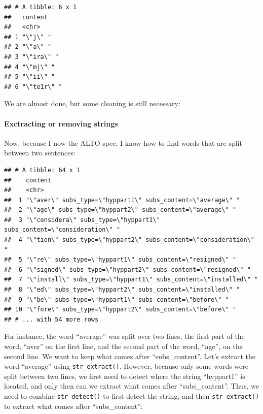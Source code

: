 \documentclass[]{gitbook}
\newenvironment{Shaded}{\begin{snugshade}}{\end{snugshade}}
\newcommand{\KeywordTok}[1]{\textcolor[rgb]{0.13,0.29,0.53}{\textbf{#1}}}
\newcommand{\NormalTok}[1]{#1}
\newcommand{\OperatorTok}[1]{\textcolor[rgb]{0.81,0.36,0.00}{\textbf{#1}}}
\newcommand{\StringTok}[1]{\textcolor[rgb]{0.31,0.60,0.02}{#1}}
\let\oldparagraph\paragraph
\renewcommand{\paragraph}[1]{\oldparagraph{#1}\mbox{}}
\begin{document}
\begin{verbatim}
## # A tibble: 6 x 1
##   content    
##   <chr>      
## 1 "\"j\" "   
## 2 "\"a\" "   
## 3 "\"ira\" " 
## 4 "\"mj\" "  
## 5 "\"ii\" "  
## 6 "\"te1r\" "
\end{verbatim}

We are almost done, but some cleaning is still necessary:

\hypertarget{exctracting-or-removing-strings}{%
\paragraph{Exctracting or removing strings}\label{exctracting-or-removing-strings}}

Now, because I now the ALTO spec, I know how to find words that are split between two sentences:

\begin{Shaded}
\end{Shaded}

\begin{verbatim}
## # A tibble: 64 x 1
##    content                                                               
##    <chr>                                                                 
##  1 "\"aver\" subs_type=\"hyppart1\" subs_content=\"average\" "           
##  2 "\"age\" subs_type=\"hyppart2\" subs_content=\"average\" "            
##  3 "\"considera\" subs_type=\"hyppart1\" subs_content=\"consideration\" "
##  4 "\"tion\" subs_type=\"hyppart2\" subs_content=\"consideration\" "     
##  5 "\"re\" subs_type=\"hyppart1\" subs_content=\"resigned\" "            
##  6 "\"signed\" subs_type=\"hyppart2\" subs_content=\"resigned\" "        
##  7 "\"install\" subs_type=\"hyppart1\" subs_content=\"installed\" "      
##  8 "\"ed\" subs_type=\"hyppart2\" subs_content=\"installed\" "           
##  9 "\"be\" subs_type=\"hyppart1\" subs_content=\"before\" "              
## 10 "\"fore\" subs_type=\"hyppart2\" subs_content=\"before\" "            
## # ... with 54 more rows
\end{verbatim}

For instance, the word ``average'' was split over two lines, the first part of the word, ``aver'' on the
first line, and the second part of the word, ``age'', on the second line. We want to keep what comes
after ``subs\_content''. Let's extract the word ``average'' using \texttt{str\_extract()}. However, because only
some words were split between two lines, we first need to detect where the string ``hyppart1'' is
located, and only then can we extract what comes after ``subs\_content''. Thus, we need to combine
\texttt{str\_detect()} to first detect the string, and then \texttt{str\_extract()} to extract what comes after
``subs\_content'':
\end{document}
